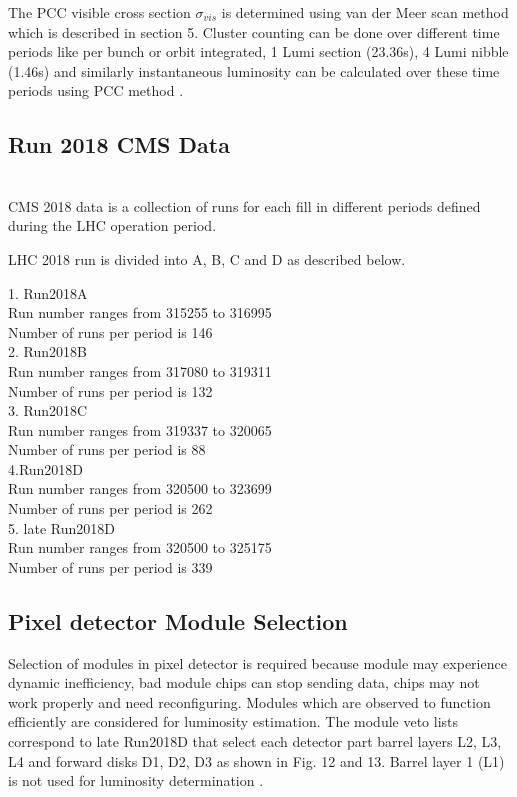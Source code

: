 The PCC visible cross section $\sigma_{vis}$ is determined using van der Meer scan method which is described in section 5. Cluster counting can be done over different time periods like per bunch or orbit integrated, 1 Lumi section (23.36s), 4 Lumi nibble (1.46s) and similarly instantaneous luminosity can be calculated over these time periods using PCC method \cite{CMS:2018elu}. \\

\subsection{Run 2018 CMS Data} \\

CMS 2018 data is a collection of runs for each fill in different periods defined during the LHC operation period.

LHC 2018 run is divided into A, B, C and D as described below. \\
\begin{flushleft}
1. Run2018A \\
Run number ranges from 315255 to 316995 \\
Number of runs per period is 146 \\

2. Run2018B\\
Run number ranges from 317080 to 319311\\
Number of runs per period is 132\\

3. Run2018C \\
Run number ranges from 319337 to 320065\\
Number of runs per period is 88 \\

4.Run2018D \\
Run number ranges from 320500 to 323699 \\
Number of runs per period is 262 \\

5. late Run2018D \\
Run number ranges from 320500 to 325175 \\
Number of runs per period is 339 \\
\end{flushleft}

\subsection{Pixel detector Module Selection}
Selection of modules in pixel detector is required because module may experience dynamic inefficiency, bad module chips can stop sending data, chips may not work properly and need reconfiguring. Modules which are observed to function efficiently are considered for luminosity estimation. The module veto lists correspond to late Run2018D that select each detector part barrel layers L2, L3, L4 and forward disks D1, D2, D3 as shown in Fig. 12 and 13. Barrel layer 1 (L1) is not used for luminosity determination \cite{vetolist}. \\

